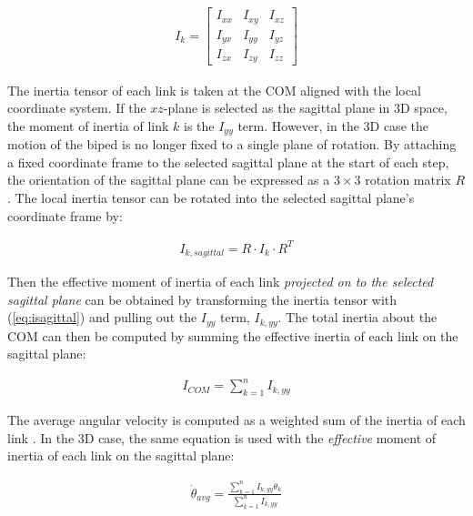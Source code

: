 \begin{equation}
	\begin{aligned}
		{I_k} = \left[ {\begin{array}{*{20}{c}}
{{I_{xx}}}&{{I_{xy}}}&{{I_{xz}}}\\
{{I_{yx}}}&{{I_{yy}}}&{{I_{yz}}}\\
{{I_{zx}}}&{{I_{zy}}}&{{I_{zz}}}
\end{array}} \right]
	\end{aligned}
\end{equation}

The inertia tensor of each link is taken at the COM aligned with the local coordinate system. If the $xz$-plane is selected as the sagittal plane in 3D space, the moment of inertia of link $k$ is the $I_{yy}$ term. However, in the 3D case the motion of the biped is no longer fixed to a single plane of rotation. By attaching a fixed coordinate frame to the selected sagittal plane at the start of each step, the orientation of the sagittal plane can be expressed as a $3\times3$ rotation matrix $R$. The local inertia tensor can be rotated into the selected sagittal plane's coordinate frame by: 

\begin{equation}
	\begin{aligned}
		{I_{k,sagittal}} = R \cdot {I_k} \cdot {R^T}
	\end{aligned}
	\label{eq:isagittal}
\end{equation}

Then the effective moment of inertia of each link \emph{projected on to the selected sagittal plane} can be obtained by transforming the inertia tensor with (\ref{eq:isagittal}) and pulling out the $I_{yy}$ term, $I_{k,yy}$. The total inertia about the COM can then be computed by summing the effective inertia of each link on the sagittal plane: 

\begin{equation}
	\begin{aligned}
		{I_{COM}} = \sum\limits_{k = 1}^n {{I_{k,yy}}}
	\end{aligned}
	\label{eq:icom_3d}
\end{equation}

The average angular velocity is computed as a weighted sum of the inertia of each link \cite{Wight:2008ii}. In the 3D case, the same equation is used with the \emph{effective} moment of inertia of each link on the sagittal plane: 

\begin{equation}
	\begin{aligned}
		{\dot \theta _{avg}} = \frac{{\sum\limits_{k = 1}^n {{I_{k,yy}}} {{\dot \theta }_k}}}{{\sum\limits_{k = 1}^n {{I_{k,yy}}} }}
	\end{aligned}
	\label{eq:wavg_3d}
\end{equation}

